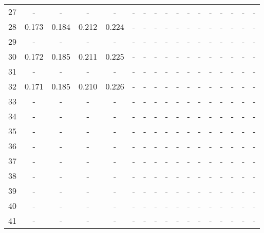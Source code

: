 \documentclass{report}
\begin{document}
\begin{appendices}
\begin{sidewaystable}
\begin{tabular}{|c|cccc|cccc|cccc|cccc|}
27 &   -   &   -   &   -   &   -   &   -   &   -   &   -   &   -   &   -   &   -   &   -   &   -   &   -   &   -   &   -   &   -   \\
28 & 0.173 & 0.184 & 0.212 & 0.224 &   -   &   -   &   -   &   -   &   -   &   -   &   -   &   -   &   -   &   -   &   -   &   -   \\
29 &   -   &   -   &   -   &   -   &   -   &   -   &   -   &   -   &   -   &   -   &   -   &   -   &   -   &   -   &   -   &   -   \\
30 & 0.172 & 0.185 & 0.211 & 0.225 &   -   &   -   &   -   &   -   &   -   &   -   &   -   &   -   &   -   &   -   &   -   &   -   \\
31 &   -   &   -   &   -   &   -   &   -   &   -   &   -   &   -   &   -   &   -   &   -   &   -   &   -   &   -   &   -   &   -   \\
32 & 0.171 & 0.185 & 0.210 & 0.226 &   -   &   -   &   -   &   -   &   -   &   -   &   -   &   -   &   -   &   -   &   -   &   -   \\
33 &   -   &   -   &   -   &   -   &   -   &   -   &   -   &   -   &   -   &   -   &   -   &   -   &   -   &   -   &   -   &   -   \\
34 &   -   &   -   &   -   &   -   &   -   &   -   &   -   &   -   &   -   &   -   &   -   &   -   &   -   &   -   &   -   &   -   \\
35 &   -   &   -   &   -   &   -   &   -   &   -   &   -   &   -   &   -   &   -   &   -   &   -   &   -   &   -   &   -   &   -   \\
36 &   -   &   -   &   -   &   -   &   -   &   -   &   -   &   -   &   -   &   -   &   -   &   -   &   -   &   -   &   -   &   -   \\
37 &   -   &   -   &   -   &   -   &   -   &   -   &   -   &   -   &   -   &   -   &   -   &   -   &   -   &   -   &   -   &   -   \\
38 &   -   &   -   &   -   &   -   &   -   &   -   &   -   &   -   &   -   &   -   &   -   &   -   &   -   &   -   &   -   &   -   \\
39 &   -   &   -   &   -   &   -   &   -   &   -   &   -   &   -   &   -   &   -   &   -   &   -   &   -   &   -   &   -   &   -   \\
40 &   -   &   -   &   -   &   -   &   -   &   -   &   -   &   -   &   -   &   -   &   -   &   -   &   -   &   -   &   -   &   -   \\
41 &   -   &   -   &   -   &   -   &   -   &   -   &   -   &   -   &   -   &   -   &   -   &   -   &   -   &   -   &   -   &   -   \\

\end{tabular}
\end{sidewaystable}
\end{appendices}
\end{document}
